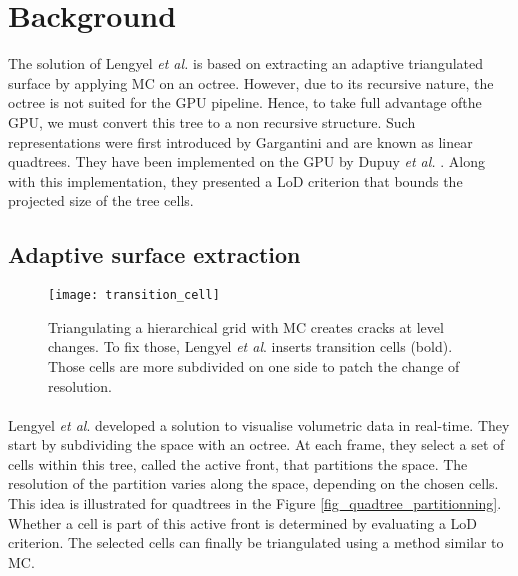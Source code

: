 \section{Background}

The solution of Lengyel \textit{et al.} \cite{lengyel2010voxel} is
based on extracting an adaptive triangulated surface by applying MC on
an octree.  However, due to its recursive nature, the octree is not
suited for the GPU pipeline.  Hence, to take full advantage ofthe GPU,
we must convert this tree to a non recursive structure.  Such
representations were first introduced by Gargantini
\cite{gargantini1982effective} and are known as linear quadtrees.
They have been implemented on the GPU by Dupuy \textit{et al.}
\cite{dupuy2014quadtrees}.  Along with this implementation, they
presented a LoD criterion that bounds the projected size of the tree
cells.

\subsection{Adaptive surface extraction}

\begin{figure}
\centering
\texttt{[image: transition\_cell]}
\caption{ Triangulating a hierarchical grid with MC creates cracks at level changes.
To fix those, Lengyel \textit{et al}. inserts transition cells (bold).
Those cells are more subdivided on one side to patch the change of resolution.}
\label{transition_cell}
\end{figure}


\paragraph{}
Lengyel \textit{et al}. \cite{lengyel2010voxel} developed a solution to visualise volumetric data in real-time.
They start by subdividing the space with an octree.
At each frame, they select a set of cells within this tree, called the active front, that partitions the space.
The resolution of the partition varies along the space, depending on the chosen cells.
This idea is illustrated for quadtrees in the Figure \ref{fig_quadtree_partitionning}.
Whether a cell is part of this active front is determined by evaluating a LoD criterion.
The selected cells can finally be triangulated using a method similar to MC.


